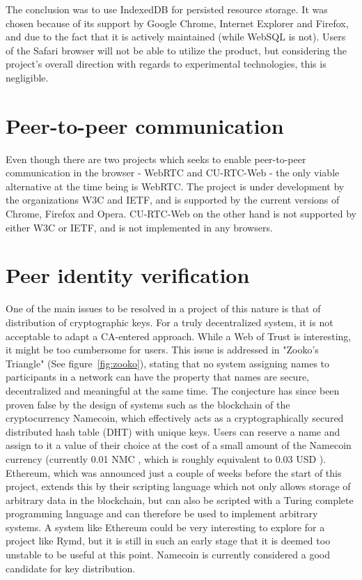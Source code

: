 The conclusion was to use IndexedDB for persisted resource storage. It was chosen because of its support by Google Chrome, Internet Explorer and Firefox, and due to the fact that it is actively maintained (while WebSQL is not). Users of the Safari browser will not be able to utilize the product, but considering the project's overall direction with regards to experimental technologies, this is negligible.

\section{Peer-to-peer communication}

Even though there are two projects which seeks to enable peer-to-peer communication in the browser - WebRTC and CU-RTC-Web - the only viable alternative at the time being is WebRTC. The project is under development by the organizations W3C and IETF, and is supported by the current versions of Chrome, Firefox and Opera. CU-RTC-Web on the other hand is not supported by either W3C or IETF, and is not implemented in any browsers.


\section{Peer identity verification}
\label{sec:authorization}
One of the main issues to be resolved in a project of this nature is that of distribution of cryptographic keys. For a truly decentralized system, it is not acceptable to adapt a CA-entered approach. While a Web of Trust is interesting, it might be too cumbersome for users. This issue is addressed in "Zooko's Triangle" (See figure~\ref{fig:zooko}), stating that no system assigning names to participants in a network can have the property that names are secure, decentralized and meaningful at the same time. The conjecture has since been proven false by the design of systems such as the blockchain of the cryptocurrency Namecoin, which effectively acts as a cryptographically secured distributed hash table (DHT) with unique keys. Users can reserve a name and assign to it a value of their choice at the cost of a small amount of the Namecoin currency (currently 0.01 NMC \cite{Namecoin:2014:Online}, which is roughly equivalent to 0.03 USD \cite{CryptoCoinCharts:2014:Online}). Ethereum, which was announced just a couple of weeks before the start of this project, extends this by their scripting language which not only allows storage of arbitrary data in the blockchain, but can also be scripted with a Turing complete programming language and can therefore be used to implement arbitrary systems. A system like Ethereum could be very interesting to explore for a project like Rymd, but it is still in such an early stage that it is deemed too unstable to be useful at this point. Namecoin is currently considered a good candidate for key distribution.

